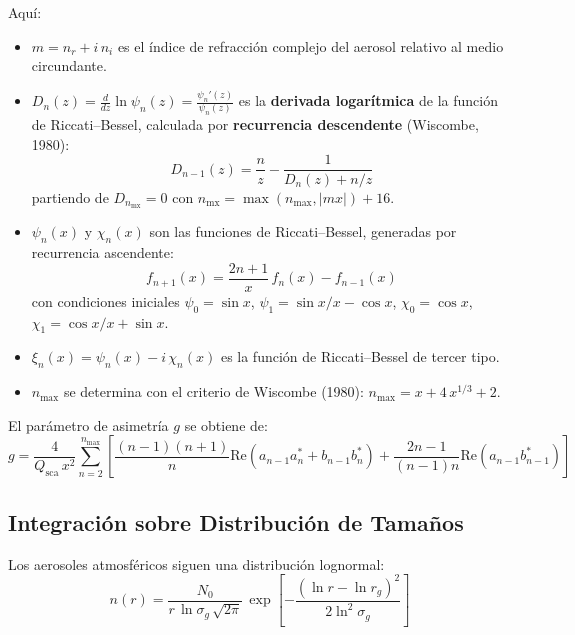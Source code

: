 \documentclass[a4paper,11pt]{article}
\begin{document}
Aqu\'i:
\begin{itemize}
    \item $m = n_r + i\,n_i$ es el \'indice de refracci\'on complejo del
          aerosol relativo al medio circundante.
    \item $D_n(z) = \frac{d}{dz}\ln\psi_n(z) = \frac{\psi_n'(z)}{\psi_n(z)}$
          es la \textbf{derivada logar\'itmica} de la funci\'on de Riccati--Bessel,
          calculada por \textbf{recurrencia descendente} (Wiscombe, 1980):
          \begin{equation}
              D_{n-1}(z) = \frac{n}{z} - \frac{1}{D_n(z) + n/z}
          \end{equation}
          partiendo de $D_{n_{\text{mx}}} = 0$ con
          $n_{\text{mx}} = \max(n_{\max}, |mx|) + 16$.
    \item $\psi_n(x)$ y $\chi_n(x)$ son las funciones de Riccati--Bessel,
          generadas por recurrencia ascendente:
          \begin{equation}
              f_{n+1}(x) = \frac{2n+1}{x}\,f_n(x) - f_{n-1}(x)
          \end{equation}
          con condiciones iniciales $\psi_0 = \sin x$,
          $\psi_1 = \sin x/x - \cos x$,
          $\chi_0 = \cos x$, $\chi_1 = \cos x/x + \sin x$.
    \item $\xi_n(x) = \psi_n(x) - i\,\chi_n(x)$ es la funci\'on de
          Riccati--Bessel de tercer tipo.
    \item $n_{\max}$ se determina con el criterio de Wiscombe (1980):
          $n_{\max} = x + 4\,x^{1/3} + 2$.
\end{itemize}

El par\'ametro de asimetr\'ia $g$ se obtiene de:
\begin{equation}
    g = \frac{4}{Q_{\text{sca}}\,x^2}\sum_{n=2}^{n_{\max}}
    \left[\frac{(n-1)(n+1)}{n}\text{Re}(a_{n-1}a_n^* + b_{n-1}b_n^*)
    + \frac{2n-1}{(n-1)n}\text{Re}(a_{n-1}b_{n-1}^*)\right]
\end{equation}

\subsection{Integraci\'on sobre Distribuci\'on de Tama\~nos}

Los aerosoles atmosf\'ericos siguen una distribuci\'on lognormal:
\begin{equation}
    n(r) = \frac{N_0}{r\,\ln\sigma_g\,\sqrt{2\pi}}\,
    \exp\!\left[-\frac{(\ln r - \ln r_g)^2}{2\ln^2\sigma_g}\right]
\end{equation}
\end{document}

